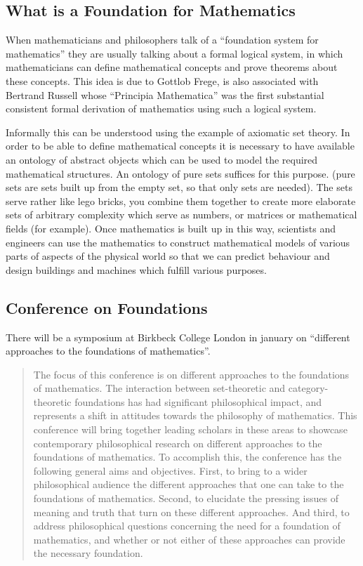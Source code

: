 \documentclass[12pt,titlepage]{article}
\begin{document}
\subsection{What is a Foundation for Mathematics}

When mathematicians and philosophers talk of a ``foundation system for mathematics'' they are usually talking about a formal logical system, in which mathematicians can define mathematical concepts and prove theorems about these concepts.
This idea is due to Gottlob Frege, is also associated with Bertrand Russell whose ``Principia Mathematica'' was the first substantial consistent formal derivation of mathematics using such a logical system.

Informally this can be understood using the example of axiomatic set theory.
In order to be able to define mathematical concepts it is necessary to have available an ontology of abstract objects which can be used to model the required mathematical structures.
An ontology of pure sets suffices for this purpose.
(pure sets are sets built up from the empty set, so that only sets are needed).
The sets serve rather like lego bricks, you combine them together to create more elaborate sets of arbitrary complexity which serve as numbers, or matrices or mathematical fields (for example).
Once mathematics is built up in this way, scientists and engineers can use the mathematics to construct mathematical models of various parts of aspects of the physical world so that we can predict behaviour and design buildings and machines which fulfill various purposes.

\subsection{Conference on Foundations}

There will be a symposium at Birkbeck College London in january on ``different approaches to the foundations of mathematics''.

\begin{quotation}
The focus of this conference is on different approaches to the foundations of mathematics. The interaction between set-theoretic and category-theoretic foundations has had significant philosophical impact, and represents a shift in attitudes towards the philosophy of mathematics.  This conference will bring together leading scholars in these areas to showcase contemporary philosophical research on different approaches to the foundations of mathematics.  To accomplish this, the conference has the following general aims and objectives. First, to bring to a wider philosophical audience the different approaches that one can take to the foundations of mathematics. Second, to elucidate the pressing issues of meaning and truth that turn on these different approaches.  And third, to address philosophical questions concerning the need for a foundation of mathematics, and whether or not either of these approaches can provide the necessary foundation.
\end{quotation}
\end{document}
